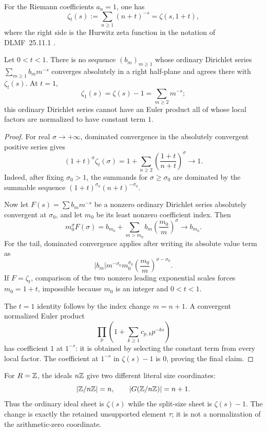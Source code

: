 For the Riemann coefficients $a_n=1$, one has
\[
 \zeta_t(s):=\sum_{n\ge1}(n+t)^{-s}=\zeta(s,1+t),
\]
where the right side is the Hurwitz zeta function in the notation of
DLMF~25.11.1 \cite[Eq.~25.11.1]{apostolDLMF25}.

\begin{theorem}
\label{thm:gcue-noninteger-shift}
Let $0<t<1$.  There is no sequence $(b_m)_{m\ge1}$ whose ordinary Dirichlet series
$\sum_{m\ge1}b_m m^{-s}$ converges absolutely in a right half-plane and agrees there with
$\zeta_t(s)$.  At $t=1$,
\[
 \zeta_1(s)=\zeta(s)-1=\sum_{m\ge2}m^{-s};
\]
this ordinary Dirichlet series cannot have an Euler product all of whose local factors are
normalized to have constant term $1$.
\end{theorem}

\begin{proof}
For real $\sigma\to+\infty$, dominated convergence in the absolutely convergent positive
series gives
\[
 (1+t)^\sigma\zeta_t(\sigma)
 =1+\sum_{n\ge2}\left(\frac{1+t}{n+t}\right)^\sigma\longrightarrow1.
\]
Indeed, after fixing $\sigma_0>1$, the summands for $\sigma\ge\sigma_0$ are dominated by
the summable sequence
$(1+t)^{\sigma_0}(n+t)^{-\sigma_0}$.

Now let $F(s)=\sum b_m m^{-s}$ be a nonzero ordinary Dirichlet series absolutely
convergent at $\sigma_0$, and let $m_0$ be its least nonzero coefficient index.  Then
\[
 m_0^\sigma F(\sigma)
 =b_{m_0}+\sum_{m>m_0}b_m\left(\frac{m_0}{m}\right)^\sigma
 \longrightarrow b_{m_0}.
\]
For the tail, dominated convergence applies after writing its absolute value term as
\[
 |b_m|m^{-\sigma_0}m_0^{\sigma_0}
 \left(\frac{m_0}{m}\right)^{\sigma-\sigma_0}.
\]
If $F=\zeta_t$, comparison of the two nonzero leading exponential scales forces
$m_0=1+t$, impossible because $m_0$ is an integer and $0<t<1$.

The $t=1$ identity follows by the index change $m=n+1$.  A convergent normalized Euler
product
\[
 \prod_p\left(1+\sum_{k\ge1}c_{p,k}p^{-ks}\right)
\]
has coefficient $1$ at $1^{-s}$: it is obtained by selecting the constant term from every
local factor.  The coefficient at $1^{-s}$ in $\zeta(s)-1$ is $0$, proving the final claim.
\end{proof}

For $R=\mathbb{Z}$, the ideals $n\mathbb{Z}$ give two different literal size coordinates:
\[
 |\mathbb{Z}/n\mathbb{Z}|=n,
 \qquad
 |G(\mathbb{Z}/n\mathbb{Z})|=n+1.
\]
Thus the ordinary ideal sheet is $\zeta(s)$ while the split-size sheet is
$\zeta(s)-1$.  The change is exactly the retained unsupported element $\tau$; it is not a
normalization of the arithmetic-zero coordinate.

